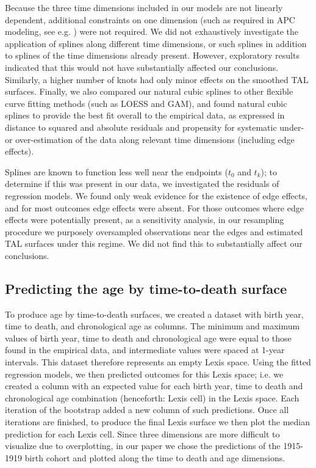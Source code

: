 \documentclass[12pt,oneside,letterpaper,doublespacing]{article}  %
\begin{document}
\begin{appendices}
Because the three time dimensions included in our models are not linearly
dependent, additional constraints on one dimension (such as required in APC
modeling, see e.g. \citet{clayton1987models}) were not required. We did not exhaustively investigate the application of splines along different time dimensions, or such splines in addition to splines of the time dimensions already present. However, exploratory results indicated that this would not have substantially affected our conclusions. Similarly, a higher number of knots had only minor effects on the smoothed TAL surfaces. Finally, we also compared our natural cubic splines to other flexible curve fitting methods (such as LOESS and GAM), and found natural cubic splines to provide the best fit overall to the empirical data, as expressed in distance to squared and absolute residuals and propensity for systematic under- or over-estimation of the data along relevant time dimensions (including edge effects).

Splines are known to function less well near the endpoints ($t_0$ and $t_k$); to determine if this was present in our data, we investigated the residuals of regression models. We found only weak evidence for the existence of edge effects, and for most outcomes edge effects were absent. For those outcomes where edge effects were potentially present, as a sensitivity analysis, in our resampling procedure we purposely oversampled observations near the edges and estimated TAL surfaces under this regime. We did not find this to substantially affect our conclusions. 

\subsection{Predicting the age by time-to-death surface}
To produce age by time-to-death surfaces, we created a dataset with birth year,
time to death, and chronological age as columns. The minimum and maximum values of birth year, time to death and chronological age were equal to those found in the empirical data, and intermediate values were spaced at 1-year intervals. This dataset therefore represents an empty Lexis space. Using the fitted regression models, we then predicted outcomes for this Lexis space; i.e. we created a column with an expected value for each birth year, time to death and chronological age combination (henceforth: Lexis cell) in the Lexis space. Each iteration of the bootstrap added a new column of such predictions. Once all iterations are finished, to produce the final Lexis surface we then plot the median prediction for each Lexis cell. Since three dimensions are more difficult to visualize due to overplotting, in our paper we chose the predictions of the 1915-1919 birth cohort and plotted along the time to death and age dimensions.


\end{appendices}
\end{document}
